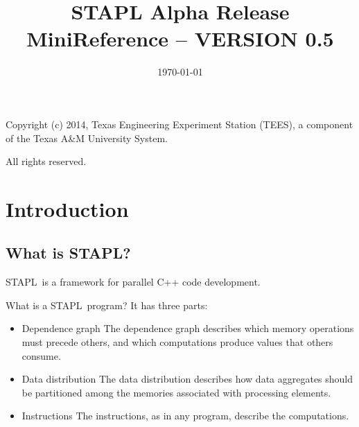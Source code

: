 \documentclass{report}
\begin{document}
\title{STAPL Alpha Release Mini\-Reference -- VERSION 0.5}
\date{\today}
\maketitle

\newenvironment{hashitemize}{%
  \renewcommand{\labelitemi}{\bfseries \#\#}%
        \begin{itemize}}{\end{itemize}}

\newcommand{\stapl}{{\sc STAPL}}
\newcommand{\stl}{{\sc STL}}
\newcommand{\pview}{{\sc PVIEW}}
\newcommand{\pviews}{{\sc PVIEWS}}
\newcommand{\pcontainer}{{\sc PCONTAINER}}
\newcommand{\pcontainers}{{\sc PCONTAINERS}}

\pagestyle{myheadings}
\renewcommand{\chaptermark}[1]{
              \markboth{*** DRAFT 0.5 *** \chaptername\ \thechapter. #1 } {} }
\renewcommand{\sectionmark}[1]{
              \markright{*** DRAFT 0.5 *** \thesection. #1 } {}}


\vspace*{8cm}
\begin{center}
Copyright (c) 2014, Texas Engineering Experiment Station (TEES), a
component of the Texas A\&M University System.

All rights reserved.
\end{center}
\pagebreak


\chapter{Introduction}


\section{What is \stapl?}

\stapl\ is a framework for parallel C++ code development.

What is a \stapl\ program?  It has three parts:
\begin{itemize}
\item Dependence graph
\newline
The dependence graph describes which memory operations must precede others,
and which computations produce values that others consume.
\item Data distribution
\newline
The data distribution describes how data aggregates should be partitioned
among the memories associated with processing elements.
\item Instructions
\newline
The instructions, as in any program, describe the computations.
\end{itemize}
\end{document}
